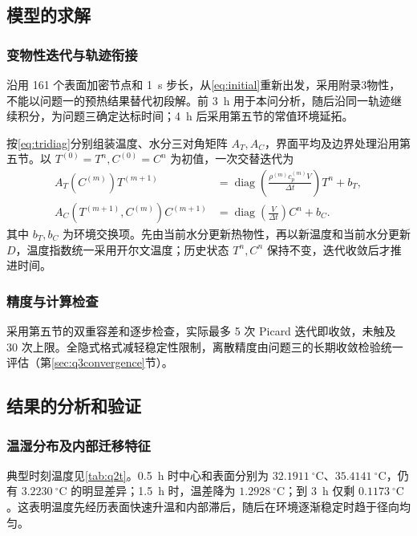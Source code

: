\subsection{模型的求解}

\subsubsection{变物性迭代与轨迹衔接}

沿用 161 个表面加密节点和 1~s 步长，从\cref{eq:initial}重新出发，采用附录3物性，不能以问题一的预热结果替代初段解。前 3~h 用于本问分析，随后沿同一轨迹继续积分，为问题三确定达标时间；4~h 后采用第五节的常值环境延拓。

按\cref{eq:tridiag}分别组装温度、水分三对角矩阵 $A_T,A_C$，界面平均及边界处理沿用第五节。以 $T^{(0)}=T^n,C^{(0)}=C^n$ 为初值，一次交替迭代为
\begin{align*}
A_T(C^{(m)})T^{(m+1)}
&=\operatorname{diag}\!\left(\frac{\rho^{(m)}c_p^{(m)}V}{\Delta t}\right)T^n+b_T,\\
A_C(T^{(m+1)},C^{(m)})C^{(m+1)}
&=\operatorname{diag}\!\left(\frac{V}{\Delta t}\right)C^n+b_C.
\end{align*}
其中 $b_T,b_C$ 为环境交换项。先由当前水分更新热物性，再以新温度和当前水分更新 $D$，温度指数统一采用开尔文温度；历史状态 $T^n,C^n$ 保持不变，迭代收敛后才推进时间。

\subsubsection{精度与计算检查}

采用第五节的双重容差和逐步检查，实际最多 5 次 Picard 迭代即收敛，未触及 30 次上限。全隐式格式减轻稳定性限制，离散精度由问题三的长期收敛检验统一评估（第\ref{sec:q3convergence}节）。

\subsection{结果的分析和验证}

\subsubsection{温湿分布及内部迁移特征}

典型时刻温度见\cref{tab:q2t}。0.5~h 时中心和表面分别为 $32.1911~{}^\circ\mathrm C$、$35.4141~{}^\circ\mathrm C$，仍有 $3.2230~{}^\circ\mathrm C$ 的明显差异；1.5~h 时，温差降为 $1.2928~{}^\circ\mathrm C$；到 3~h 仅剩 $0.1173~{}^\circ\mathrm C$。这表明温度先经历表面快速升温和内部滞后，随后在环境逐渐稳定时趋于径向均匀。

